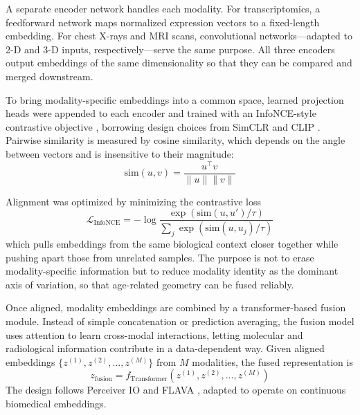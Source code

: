 \documentclass[10pt,twocolumn]{article}
\begin{document}
A separate encoder network handles each modality. For transcriptomics, a feedforward network
maps normalized expression vectors to a fixed-length embedding. For chest X-rays and MRI
scans, convolutional networks---adapted to 2-D and 3-D inputs, respectively---serve the
same purpose. All three encoders output embeddings of the same dimensionality so that they
can be compared and merged downstream.

To bring modality-specific embeddings into a common space, learned projection heads
were appended to each encoder and trained with an InfoNCE-style contrastive objective \cite{oord2018cpc},
borrowing design choices from SimCLR and CLIP \cite{chen2020simclr,radford2021clip}. Pairwise
similarity is measured by cosine similarity, which depends on the angle between vectors and is
insensitive to their magnitude:
\begin{equation}
\mathrm{sim}(u, v) = \frac{u^\top v}{\|u\| \|v\|}
\label{eq:cosine}
\end{equation}

Alignment was optimized by minimizing the contrastive loss
\begin{equation}
\mathcal{L}_{\text{InfoNCE}}
=
- \log
\frac{\exp(\mathrm{sim}(u,u') / \tau)}
{\sum_{j} \exp(\mathrm{sim}(u,u_j)/\tau)}
\label{eq:infonce}
\end{equation}
which pulls embeddings from the same biological context closer together while pushing apart
those from unrelated samples. The purpose is not to erase modality-specific information but to
reduce modality identity as the dominant axis of variation, so that age-related geometry can be
fused reliably.

Once aligned, modality embeddings are combined by a transformer-based fusion module. Instead of
simple concatenation or prediction averaging, the fusion model uses attention to learn cross-modal
interactions, letting molecular and radiological information contribute in a data-dependent way.
Given aligned embeddings $\{z^{(1)}, z^{(2)}, \dots, z^{(M)}\}$ from $M$ modalities, the fused
representation is
\begin{equation}
z_{\text{fusion}} = f_{\text{Transformer}}\left(
z^{(1)}, z^{(2)}, \dots, z^{(M)}
\right)
\label{eq:fusion}
\end{equation}
The design follows Perceiver IO and FLAVA \cite{jaegle2021perceiver,singh2021flava}, adapted to
operate on continuous biomedical embeddings.
\end{document}
